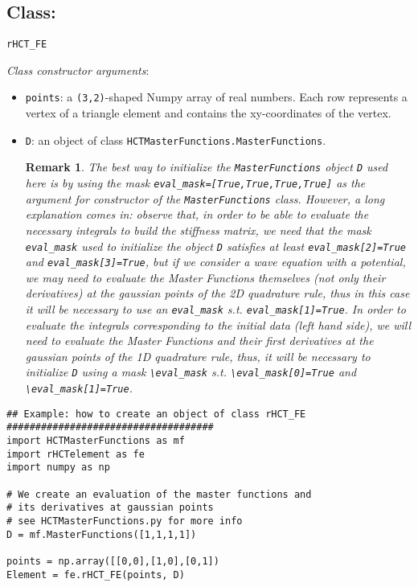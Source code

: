 \documentclass{amsart}
\theoremstyle{plain}
\newtheorem{remark}{Remark}
\theoremstyle{definition}
\theoremstyle{remark}
\numberwithin{equation}{section}
\begin{document}
\subsection{Class:} \verb|rHCT_FE|

\textit{Class constructor arguments}: 
\begin{itemize}
\item  \verb|points|: a \verb|(3,2)|-shaped Numpy array of real numbers. Each row represents a vertex of a triangle element and contains the xy-coordinates of the vertex.
\item \verb|D|: an object of class \verb|HCTMasterFunctions.MasterFunctions|. 
\begin{remark} The best way to initialize the \verb|MasterFunctions| object \verb|D| used here is by using the mask \verb|eval_mask=[True,True,True,True]| as the argument for constructor of the \verb|MasterFunctions| class. However, a long explanation comes in: observe that, in order to be able to evaluate the necessary integrals to build the stiffness matrix, we need that the mask \verb|eval_mask| used to initialize the object \verb|D| satisfies at least \verb|eval_mask[2]=True| and  \verb|eval_mask[3]=True|, but if we consider a wave equation with a potential, we may need to evaluate the Master Functions themselves (not only their derivatives) at the gaussian points of the 2D quadrature rule, thus in this case it will be necessary to use an \verb|eval_mask| s.t. \verb|eval_mask[1]=True|. In order to evaluate the integrals corresponding to the initial data (left hand side), we will need to evaluate the Master Functions and their first derivatives at the gaussian points of the 1D quadrature rule, thus, it will be necessary to initialize \verb|D| using a mask \verb|\eval_mask| s.t. \verb|\eval_mask[0]=True| and \verb|\eval_mask[1]=True|.
\end{remark}
\end{itemize}

\begin{lstlisting} 
## Example: how to create an object of class rHCT_FE
####################################
import HCTMasterFunctions as mf
import rHCTelement as fe
import numpy as np

# We create an evaluation of the master functions and 
# its derivatives at gaussian points
# see HCTMasterFunctions.py for more info
D = mf.MasterFunctions([1,1,1,1])

points = np.array([[0,0],[1,0],[0,1])
Element = fe.rHCT_FE(points, D)
\end{lstlisting}
\end{document}
